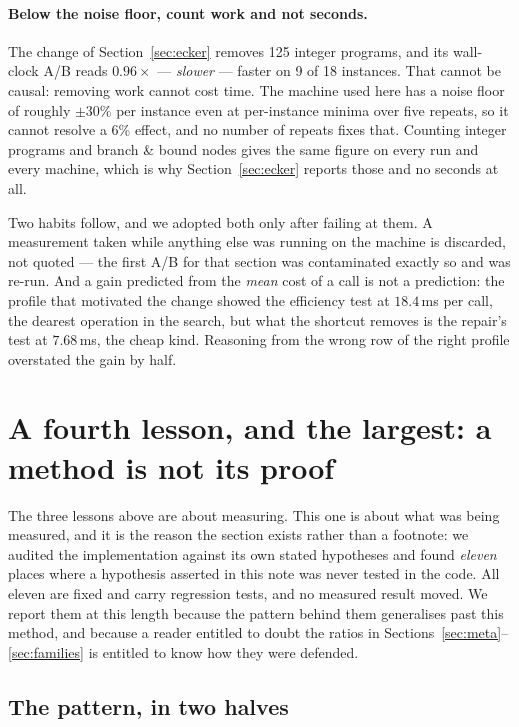 \documentclass[11pt,a4paper]{article}
\begin{document}
\paragraph{Below the noise floor, count work and not seconds.} The change of
Section~\ref{sec:ecker} removes 125 integer programs, and its wall-clock A/B
reads $0.96\times$ --- \emph{slower} --- faster on 9 of 18 instances. That
cannot be causal: removing work cannot cost time. The machine used here has a
noise floor of roughly $\pm 30\%$ per instance even at per-instance minima over
five repeats, so it cannot resolve a $6\%$ effect, and no number of repeats
fixes that. Counting integer programs and branch \& bound nodes gives the same
figure on every run and every machine, which is why
Section~\ref{sec:ecker} reports those and no seconds at all.

Two habits follow, and we adopted both only after failing at them. A
measurement taken while anything else was running on the machine is discarded,
not quoted --- the first A/B for that section was contaminated exactly so and
was re-run. And a gain predicted from the \emph{mean} cost of a call is not a
prediction: the profile that motivated the change showed the efficiency test at
$18.4$\,ms per call, the dearest operation in the search, but what the shortcut
removes is the repair's test at $7.68$\,ms, the cheap kind. Reasoning from the
wrong row of the right profile overstated the gain by half.

\section{A fourth lesson, and the largest: a method is not its proof}
\label{sec:audit}

The three lessons above are about measuring. This one is about what was being
measured, and it is the reason the section exists rather than a footnote: we
audited the implementation against its own stated hypotheses and found
\emph{eleven} places where a hypothesis asserted in this note was never tested
in the code. All eleven are fixed and carry regression tests, and no measured
result moved. We report them at this length because the pattern behind them
generalises past this method, and because a reader entitled to doubt the ratios
in Sections~\ref{sec:meta}--\ref{sec:families} is entitled to know how they
were defended.

\subsection{The pattern, in two halves}
\end{document}
